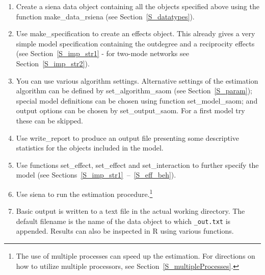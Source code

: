 \documentclass[a4paper,fleqn,11pt]{article}
\newcommand{\+}{\, + \,}
\newcommand{\sfn}[1]{\textsf{#1}}
\newcommand{\R}{{\sf R }}
\begin{document}
\begin{enumerate}
\begin{enumerate}
                changing/varying individual covariates respectively;
		\item	\sfn{as\_covariate\_rsiena} and \sfn{as\_covariate\_rsiena} for
                constant and changing/varying dyadic covariates respectively;
		\item	In case of two-mode networks, for each object it should
                be specified which nodeset it is defined on, using the
                \sfn{nodeSets} argument in the above functions.
	\end{enumerate}
	\item	Create a \textsf{siena} data object containing all the objects
            specified above using the function \sfn{make\_data\_rsiena}
            (see Section~\ref{S_datatypes}).
	\item	Use \sfn{make\_specification} to create an effects object.
            This already gives a very simple model specification
            containing the outdegree and a reciprocity effects
            (see Section~\ref{S_imp_str1} - for two-mode networks see
            Section~\ref{S_imp_str2}).
	\item	You can use various algorithm settings.
            Alternative settings of the estimation algorithm can be defined by
            \sfn{set\_algorithm\_saom} (see Section~\ref{S_param});
            special model definitions
            can be chosen using function \sfn{set\_model\_saom};
            and output options can be chosen by \sfn{set\_output\_saom}.
            For a first model try these can be skipped.
	\item	Use \sfn{write\_report} to produce an output file
                 presenting some descriptive statistics
                for the objects included in the model.
	\item	Use functions \sfn{set\_effect}, \sfn{set\_effect} and
            \sfn{set\_interaction} to further specify the model
            (see Sections~\ref{S_imp_str1}~--~\ref{S_eff_beh}).
	\item	Use \sfn{siena} %
            to run the estimation procedure.\footnote{The
            use of multiple processes can speed up the estimation.
            For directions on how to utilize multiple processors,
            see Section~\ref{S_multipleProcesses}.}
	\item	Basic output is written to a text file in the actual working directory.
             The default filename is the name of the data object
             to which \texttt{\_out.txt} is appended. Results can also be
             inspected in \R using various functions.
\end{enumerate}
\end{document}
